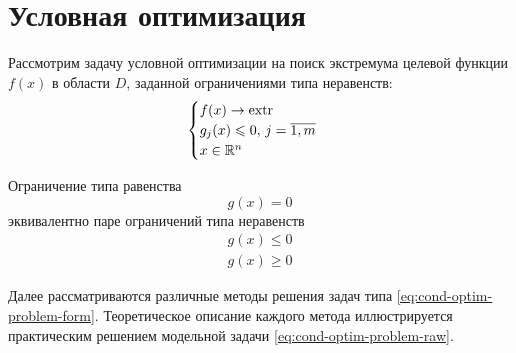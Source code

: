 \section{Условная оптимизация}

Рассмотрим задачу условной оптимизации на поиск экстремума целевой
функции $f(x)$ в области $D$, заданной ограничениями типа неравенств:
\begin{equation}
  \label{eq:cond-optim-problem-form}
  \begin{cases}
    f(x) \to \operatorname{extr} \\
    g_j(x) \leqslant 0,\, j=\overline{1,m} \\
    x \in \mathbb{R}^n
  \end{cases}
\end{equation}

\begin{rem}
  \label{rem:eq-noneq}
  Ограничение типа равенства
  \begin{equation*}
    g(x) = 0
  \end{equation*}
  эквивалентно паре ограничений типа неравенств
  \begin{align*}
    g(x) \leq 0 \\
    g(x) \geq 0
  \end{align*}
\end{rem}

Далее рассматриваются различные методы решения задач типа
\eqref{eq:cond-optim-problem-form}. Теоретическое описание каждого
метода иллюстрируется практическим решением модельной задачи
\eqref{eq:cond-optim-problem-raw}.



\clearpage


\clearpage

